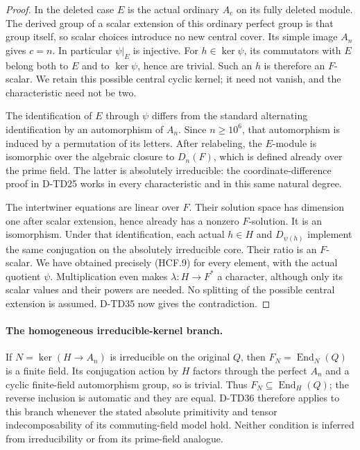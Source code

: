\begin{proof}
In the deleted case $E$ is the actual ordinary $A_c$ on its
fully deleted module.  The derived group of a scalar extension
of this ordinary perfect group is that group itself, so scalar
choices introduce no new central cover.  Its simple image
$A_n$ gives $c=n$.  In particular $\psi|_E$ is injective.
For $h\in\ker\psi$, its commutators with $E$ belong both
to $E$ and to $\ker\psi$, hence are trivial.  Such an $h$
is therefore an $F$-scalar.  We retain this possible central
cyclic kernel; it need not vanish, and the characteristic
need not be two.

The identification of $E$ through $\psi$ differs from the
standard alternating identification by an automorphism of $A_n$.
Since $n\ge10^6$, that automorphism is induced by a permutation
of its letters.  After relabeling, the $E$-module is isomorphic
over the algebraic closure to $D_n(F)$, which is defined already
over the prime field.  The latter is absolutely irreducible:
the coordinate-difference proof in D-TD25 works in every
characteristic and in this same natural degree.

The intertwiner equations are linear over $F$.  Their solution
space has dimension one after scalar extension, hence already
has a nonzero $F$-solution.  It is an isomorphism.  Under that
identification, each actual $h\in H$ and $D_{\psi(h)}$
implement the same conjugation on the absolutely irreducible
core.  Their ratio is an $F$-scalar.  We have obtained precisely
(HCF.9) for every element, with the actual quotient $\psi$.
Multiplication even makes $\lambda:H\to F^*$ a character,
although only its scalar values and their powers are needed.
No splitting of the possible central extension is assumed.
D-TD35 now gives the contradiction.
\end{proof}

\paragraph{The homogeneous irreducible-kernel branch.}
If $N=\ker(H\to A_n)$ is irreducible on the original $Q$,
then $F_N=\operatorname{End}_N(Q)$ is a finite field.
Its conjugation action by $H$ factors through the perfect
$A_n$ and a cyclic finite-field automorphism group, so is
trivial.  Thus $F_N\subseteq\operatorname{End}_H(Q)$;
the reverse inclusion is automatic and they are equal.
D-TD36 therefore applies to this branch whenever the stated
absolute primitivity and tensor indecomposability of its
commuting-field model hold.  Neither condition is inferred
from irreducibility or from its prime-field analogue.

